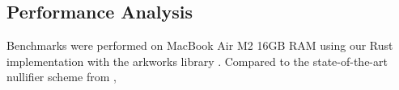     
    
    
    























\subsection{Performance Analysis}
Benchmarks were performed on MacBook Air M2 16GB RAM using our Rust implementation with the arkworks library \cite{arkworks_contributors_arkworks_2022}. Compared to the state-of-the-art nullifier scheme from \cite{tomescu2022utt},




